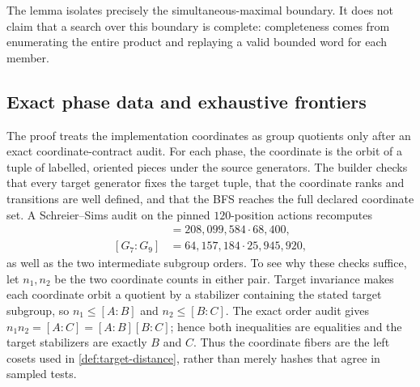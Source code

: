 The lemma isolates precisely the simultaneous-maximal boundary.  It does not
claim that a search over this boundary is complete: completeness comes from
enumerating the entire product and replaying a valid bounded word for each
member.

\subsection{Exact phase data and exhaustive frontiers}
\label{sec:phase-data}

The proof treats the implementation coordinates as group quotients only after
an exact coordinate-contract audit.  For each phase, the coordinate is the
orbit of a tuple of labelled, oriented pieces under the source generators.
The builder checks that every target generator fixes the target tuple, that
the coordinate ranks and transitions are well defined, and that the BFS
reaches the full declared coordinate set.  A Schreier--Sims audit on the
pinned $120$-position actions recomputes
\begin{align*}
 [G_5:G_7]&=208{,}099{,}584\cdot68{,}400,\\
 [G_7:G_9]&=64{,}157{,}184\cdot25{,}945{,}920,
\end{align*}
as well as the two intermediate subgroup orders.  To see why these checks
suffice, let $n_1,n_2$ be the two coordinate counts in either pair.  Target
invariance makes each coordinate orbit a quotient by a stabilizer containing
the stated target subgroup, so
\(n_1\leq[A:B]\) and \(n_2\leq[B:C]\).  The exact order audit gives
\(n_1n_2=[A:C]=[A:B][B:C]\); hence both inequalities are equalities and the
target stabilizers are exactly $B$ and $C$.  Thus the coordinate fibers are
the left cosets used in \cref{def:target-distance}, rather than merely hashes
that agree in sampled tests.

